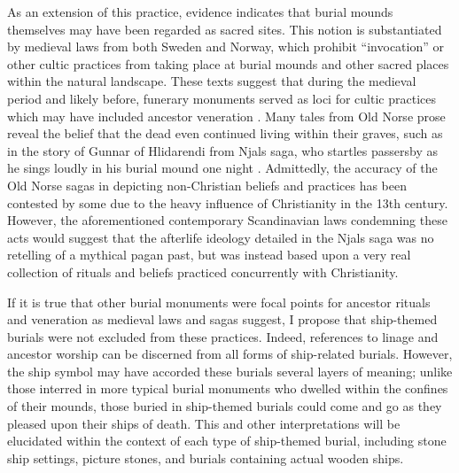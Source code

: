 As an extension of this practice, evidence indicates that burial mounds themselves may have been regarded as sacred sites. This notion is substantiated by medieval laws from both Sweden and Norway, which prohibit “invocation” or other cultic practices from taking place at burial mounds and other sacred places within the natural landscape. These texts suggest that during the medieval period and likely before, funerary monuments served as loci for cultic practices which may have included ancestor veneration \parencite[198--199]{Sundqvist_2015}.
Many tales from Old Norse prose reveal the belief that the dead even continued living within their graves, such as in the story of Gunnar of Hlidarendi from Njals saga, who startles passersby as he sings loudly in his burial mound one night \parencite[261]{Price_2008}. Admittedly, the accuracy of the Old Norse sagas in depicting non-Christian beliefs and practices has been contested by some due to the heavy influence of Christianity in the 13th century. However, the aforementioned contemporary Scandinavian laws condemning these acts would suggest that the afterlife ideology detailed in the Njals saga was no retelling of a mythical pagan past, but was instead based upon a very real collection of rituals and beliefs practiced concurrently with Christianity.

If it is true that other burial monuments were focal points for ancestor rituals and veneration as medieval laws and sagas suggest, I propose that ship-themed burials were not excluded from these practices. Indeed, references to linage and ancestor worship can be discerned from all forms of ship-related burials. However, the ship symbol may have accorded these burials several layers of meaning; unlike those interred in more typical burial monuments who dwelled within the confines of their mounds, those buried in ship-themed burials could come and go as they pleased upon their ships of death. This and other interpretations will be elucidated within the context of each type of ship-themed burial, including stone ship settings, picture stones, and burials containing actual wooden ships.

